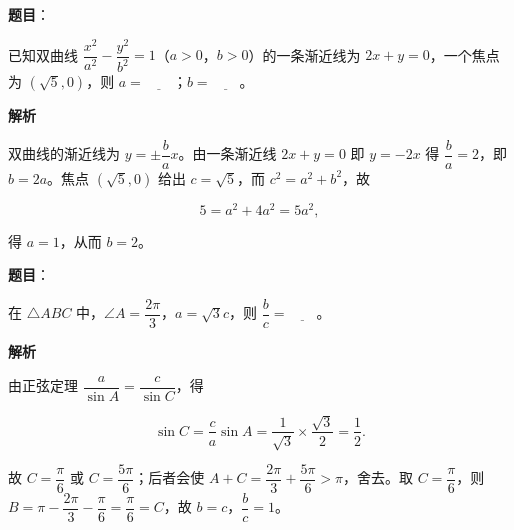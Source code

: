 \begin{answer}

\textbf{题目}：

已知双曲线 \(\dfrac{x^{2}}{a^{2}}-\dfrac{y^{2}}{b^{2}}=1\)（\(a>0\)，\(b>0\)）的一条渐近线为 \(2x+y=0\)，一个焦点为 \((\sqrt{5},0)\)，则 \(a=\underline{\qquad}\)；\(b=\underline{\qquad}\)。

\textbf{解析}

双曲线的渐近线为 \(y=\pm\dfrac{b}{a}x\)。由一条渐近线 \(2x+y=0\) 即 \(y=-2x\) 得 \(\dfrac{b}{a}=2\)，即 \(b=2a\)。焦点 \((\sqrt{5},0)\) 给出 \(c=\sqrt{5}\)，而 \(c^{2}=a^{2}+b^{2}\)，故

\nopagebreak[4]
\[
5=a^{2}+4a^{2}=5a^{2},
\]

得 \(a=1\)，从而 \(b=2\)。


\end{answer}
\begin{answer}

\textbf{题目}：

在 \(\triangle ABC\) 中，\(\angle A=\dfrac{2\pi}{3}\)，\(a=\sqrt{3}c\)，则 \(\dfrac{b}{c}=\underline{\qquad}\)。

\textbf{解析}

由正弦定理 \(\dfrac{a}{\sin A}=\dfrac{c}{\sin C}\)，得

\nopagebreak[4]
\[
\sin C=\frac{c}{a}\sin A=\frac{1}{\sqrt{3}}\times\frac{\sqrt{3}}{2}=\frac12 .
\]

故 \(C=\dfrac{\pi}{6}\) 或 \(C=\dfrac{5\pi}{6}\)；后者会使 \(A+C=\dfrac{2\pi}{3}+\dfrac{5\pi}{6}>\pi\)，舍去。取 \(C=\dfrac{\pi}{6}\)，则 \(B=\pi-\dfrac{2\pi}{3}-\dfrac{\pi}{6}=\dfrac{\pi}{6}=C\)，故 \(b=c\)，\(\dfrac{b}{c}=1\)。


\end{answer}

